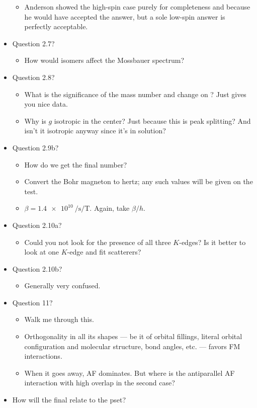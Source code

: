 \documentclass[../notes.tex]{subfiles}
\begin{document}
\begin{itemize}
\begin{itemize}
        \item Anderson showed the high-spin case purely for completeness and because he would have accepted the answer, but a sole low-spin answer is perfectly acceptable.
    \end{itemize}
    \item Question 2.7?
    \begin{itemize}
        \item How would isomers affect the Mossbauer spectrum?
    \end{itemize}
    \item Question 2.8?
    \begin{itemize}
        \item What is the significance of the mass number and change on ? Just gives you nice data.
        \item Why is $g$ isotropic in the center? Just because this is peak splitting? And isn't it isotropic anyway since it's in solution?
    \end{itemize}
    \item Question 2.9b?
    \begin{itemize}
        \item How do we get the final number?
        \item Convert the Bohr magneton to hertz; any such values will be given on the test.
        \item $\beta=\SI{1.4e10}{\per\second\per\tesla}$. Again, take $\beta/h$.
    \end{itemize}
    \item Question 2.10a?
    \begin{itemize}
        \item Could you not look for the presence of all three $K$-edges? Is it better to look at one $K$-edge and fit scatterers?
    \end{itemize}
    \item Question 2.10b?
    \begin{itemize}
        \item Generally very confused.
    \end{itemize}
    \item Question 11?
    \begin{itemize}
        \item Walk me through this.
        \item Orthogonality in all its shapes --- be it of orbital fillings, literal orbital configuration and molecular structure, bond angles, etc. --- favors FM interactions.
        \item When it goes away, AF dominates. But where is the antiparallel AF interaction with high overlap in the second case?
    \end{itemize}
    \item How will the final relate to the pset?
\end{itemize}
\end{document}
